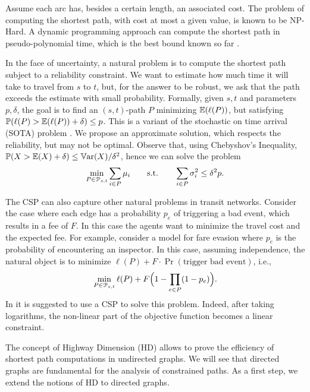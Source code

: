 
Assume each arc has, besides a certain length, an associated cost. 
The problem of computing the shortest path, with cost at most a given value, is known to be NP-Hard.
A dynamic programming approach can compute the shortest path in pseudo-polynomial time, which is the best bound known so far .

In the face of uncertainty, a natural problem is to compute the shortest path subject to a reliability constraint.
We want to estimate how much time it will take to travel from $s$ to $t$, but, for the answer to be robust, we ask that the path exceeds the estimate with small probability.
Formally, given $s,t$ and parameters $p,\delta$, the goal is to find an $(s,t)$-path $P$ minimizing $\mathbb{E}(\ell(P))$, but satisfying $\mathbb{P}(\ell(P)>\mathbb{E}(\ell(P))+\delta)\leq p$.
This is a variant of the stochastic on time arrival (SOTA) problem .
We propose an approximate solution, which respects the reliability, but may not be optimal.
Observe that, using Chebyshov's Inequality, $\mathbb{P}(X>\mathbb{E}(X)+\delta)\leq \mathbb{V}\textnormal{ar}(X)/\delta^2$, hence we can solve
the problem 
\[
\min_{ P\in\mathcal{P}_{s,t}}\sum_{i\in P}\mu_i \qquad \text{s.t.}\qquad \sum_{i\in P}\sigma^2_i\leq \delta^2p.
\]


The CSP can also capture other natural problems in transit networks.
Consider the case where each edge has a probability $p_e$ of triggering a bad event, which results in a fee of $F$.
In this case the agents want to minimize the travel cost and the expected fee.
For example, \citet{fareevasion} consider a model for fare evasion where $p_e$ is the probability of encountering an inspector.
In this case, assuming independence, the natural object is to minimize $\ell(P)+F\cdot\Pr(\text{trigger bad event})$, i.e.,
\[
\min_{P\in\mathcal{P}_{s,t}} \ell(P)+F\Bigl(1-\prod_{e\in P}(1-p_e)\Bigr).
\]
In \citep{fareevasion} it is suggested to use a CSP to solve this problem.
Indeed, after taking logarithms, the non-linear part of the objective function becomes a linear constraint.

The concept of Highway Dimension (HD) \cite{highway2010,highway2013} allows to prove the efficiency of shortest path computations in undirected graphs.
We will see that directed graphs are fundamental for the analysis of constrained paths.
As a first step, we extend the notions of HD to directed graphs.